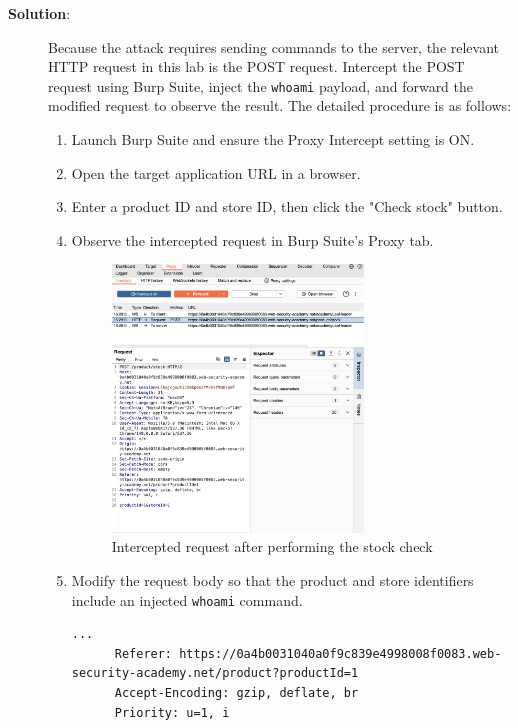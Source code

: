 \documentclass{article}
\begin{document}
\begin{description}
    \item[\textbf{Solution}:] \leavevmode\par
    Because the attack requires sending commands to the server, the relevant HTTP request in this lab is the POST request. Intercept the POST request using Burp Suite, inject the \texttt{whoami} payload, and forward the modified request to observe the result. The detailed procedure is as follows:
    \begin{enumerate}
      \item Launch Burp Suite and ensure the Proxy Intercept setting is ON.
      \item Open the target application URL in a browser.
      \item Enter a product ID and store ID, then click the "Check stock" button.
      \item Observe the intercepted request in Burp Suite's Proxy tab.
      
      \begin{figure}[htbp]
      \centering
      \includegraphics[width=0.7\textwidth]{../figure/figure1.png}
      \caption{Intercepted request after performing the stock check}
      \label{fig:stock-checker}
      \end{figure}

      \item Modify the request body so that the product and store identifiers include an injected \texttt{whoami} command.
      
      \begin{lstlisting}[label={lst:original-request},caption={Original request}]
      ...
      Referer: https://0a4b0031040a0f9c839e4998008f0083.web-security-academy.net/product?productId=1
      Accept-Encoding: gzip, deflate, br
      Priority: u=1, i


\end{lstlisting}
\end{enumerate}
\end{description}
\end{document}
